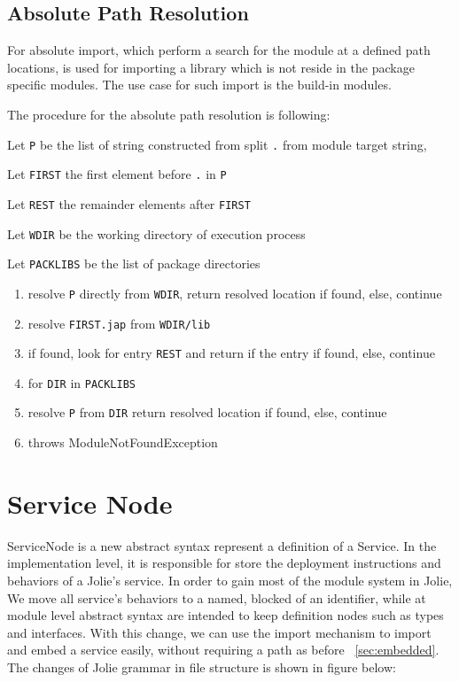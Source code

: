 \subsection{ Absolute Path Resolution }

For absolute import, which perform a search for the module at a defined path locations, is used for importing a library which is not reside in the package specific modules. The use case for such import is the build-in modules. 

The procedure for the absolute path resolution is following:

Let \texttt{P} be the list of string constructed from split \texttt{.} from module target string,  

Let \texttt{FIRST} the first element before \texttt{.} in \texttt{P}

Let \texttt{REST} the remainder elements after \texttt{FIRST}

Let \texttt{WDIR} be the working directory of execution process

Let \texttt{PACKLIBS} be the list of package directories

\begin{enumerate}
    \item resolve \texttt{P} directly from \texttt{WDIR}, return resolved location if found, else, continue
    \item resolve \texttt{FIRST.jap} from \texttt{WDIR/lib} 
        \item if found, look for entry \texttt{REST} and return if the entry if found, else, continue
    \item for \texttt{DIR} in \texttt{PACKLIBS}
        \item resolve \texttt{P} from \texttt{DIR} return resolved location if found, else, continue
    \item throws ModuleNotFoundException
\end{enumerate}

\section { Service Node }

ServiceNode is a new abstract syntax represent a definition of a Service.
In the implementation level, it is responsible for store the deployment instructions and behaviors of a Jolie’s service.
In order to gain most of the module system in Jolie,  We move all service’s behaviors to a named, blocked of an identifier, while at module level abstract syntax are intended to keep definition nodes such as types and interfaces.
With this change, we can use the import mechanism to import and embed a service easily, without requiring a path as before ~\ref{sec:embedded}.
The changes of Jolie grammar in file structure is shown in figure below:


